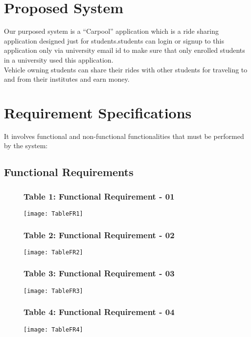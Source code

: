 \section{Proposed System}
Our purposed system is a “Carpool” application which is a ride sharing application designed just for students.students can login or signup to this application only via university email id to make sure that only enrolled students in a university used this application.
\\ Vehicle owning students can share their rides with other students for traveling to and from their institutes and earn money.

\section{Requirement Specifications}
It involves functional and non-functional functionalities that must be performed by the system:

\subsection{Functional Requirements}

\begin{figure}[ht]
\subsubsection{Table 1: Functional Requirement - 01}
\centering
\texttt{[image: TableFR1]}
\end{figure}

\begin{figure}[ht]
\subsubsection{Table 2: Functional Requirement - 02}
\centering
\texttt{[image: TableFR2]}
\end{figure}

\begin{figure}[ht]
\subsubsection{Table 3: Functional Requirement - 03}
\centering
\texttt{[image: TableFR3]}
\end{figure}

\begin{figure}[ht]
\subsubsection{Table 4: Functional Requirement - 04}
\centering
\texttt{[image: TableFR4]}
\end{figure}

